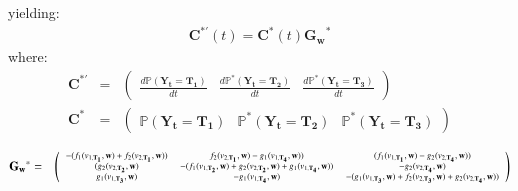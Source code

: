 yielding:
\begin{eqnarray}
\label{eqAnn2_5.12} \mathbf{C}^{*'}(t)=\mathbf{C}^*(t)\mathbf{G_w}^*
\end{eqnarray}
where:
\begin{eqnarray}
\nonumber
\mathbf{C}^{*'}&=&\left(\begin{array}{ccc} \frac{d\mathbb{P}(\mathbf{Y_t}=\mathbf{T_1})}{dt} & \frac{d\mathbb{P}^*(\mathbf{Y_t}=\mathbf{T_2})}{dt} & \frac{d\mathbb{P}^*(\mathbf{Y_t}=\mathbf{T_3})}{dt} \end{array}\right) \\
%
\nonumber \mathbf{C}^{*}&=&\left(\begin{array}{ccc} \mathbb{P}(\mathbf{Y_t}=\mathbf{T_1}) & \mathbb{P}^*(\mathbf{Y_t}=\mathbf{T_2}) & \mathbb{P}^*(\mathbf{Y_t}=\mathbf{T_3}) \end{array}\right)
\end{eqnarray}


\begin{landscape}
\begin{eqnarray}
\nonumber \mathbf{G_w}^*&=& \scriptsize{
\left(\begin{array}{cccc}
-(f_1(v_{1,\mathbf{T_1}}, \mathbf{w})+f_2(v_{2,\mathbf{T_1}}, \mathbf{w})) & f_2(v_{2,\mathbf{T_1}}, \mathbf{w})-g_1(v_{1,\mathbf{T_4}}, \mathbf{w})) & (f_1(v_{1,\mathbf{T_1}}, \mathbf{w})-g_2(v_{2,\mathbf{T_4}}, \mathbf{w})) \\
(g_2(v_{2,\mathbf{T_2}}, \mathbf{w})  & -(f_1(v_{1,\mathbf{T_2}}, \mathbf{w})+g_2(v_{2,\mathbf{T_2}}, \mathbf{w})+g_1(v_{1,\mathbf{T_4}}, \mathbf{w})) & -g_2(v_{2,\mathbf{T_4}}, \mathbf{w})  \\
g_1(v_{1,\mathbf{T_3}}, \mathbf{w}) & -g_1(v_{1,\mathbf{T_4}}, \mathbf{w})  & -(g_1(v_{1,\mathbf{T_3}}, \mathbf{w})+f_2(v_{2,\mathbf{T_3}}, \mathbf{w})+g_2(v_{2,\mathbf{T_4}}, \mathbf{w}))
\end{array}\right)}
\end{eqnarray}
\end{landscape}


